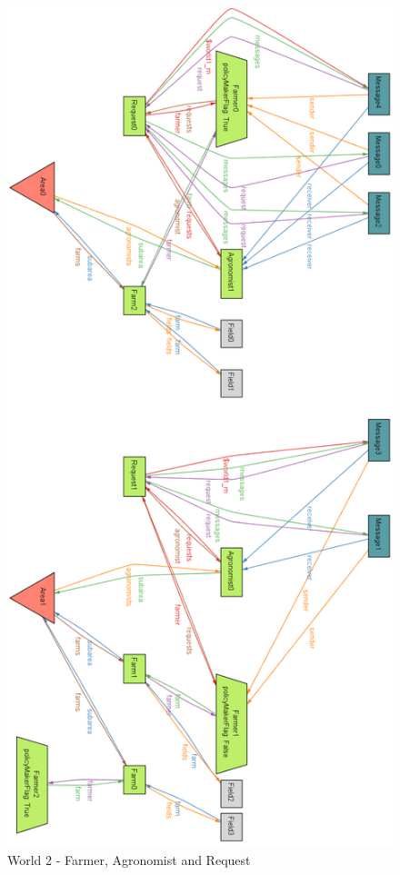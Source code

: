 \begin{figure}[H]
\centering
\includegraphics[scale=0.34]{../AlloyCode/ExportWorldPNG/world2_farmer_agro_requests.png}
\caption{\label{fig:alloyExecution}World 2 - Farmer, Agronomist and Request}
\end{figure}

